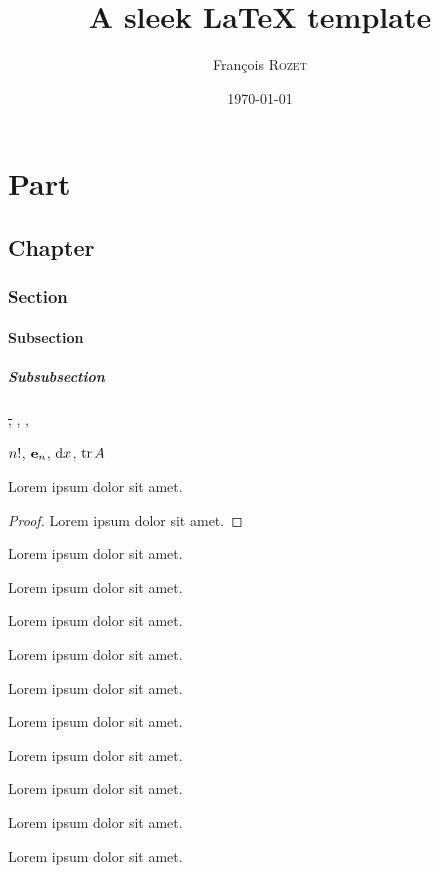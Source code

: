 \documentclass[a4paper, 12pt]{report}
\title{A sleek \LaTeX{} template}
\author{François \textsc{Rozet}\\}
\date{\today}
\begin{document}
	
	\mytableofcontents
	\part{Part}
	\chapter{Chapter}
	\section{Section}
	\subsection{Subsection}
	\subsubsection{Subsubsection}
	\newpage	
	
	\st, \tq, \cad, \Cad
	
	\vspace{2cm}
	
	$n!$, $\mathbf{e}_{n}$, $\mathrm{d} x$, $\operatorname{tr}{A}$
	
	\vspace{2cm}
	
	\begin{thm}
		Lorem ipsum dolor sit amet.
	\end{thm}
	\begin{proof}
		Lorem ipsum dolor sit amet.
	\end{proof}
	\begin{lem}
		Lorem ipsum dolor sit amet.
	\end{lem}
	\begin{prop}
		Lorem ipsum dolor sit amet.
	\end{prop}
	\begin{defn}
		Lorem ipsum dolor sit amet.
	\end{defn}
	\begin{hyp}
		Lorem ipsum dolor sit amet.
	\end{hyp}
	\begin{quest}
		Lorem ipsum dolor sit amet.
	\end{quest}
	\begin{answ}
		Lorem ipsum dolor sit amet.
	\end{answ}
	\begin{expl}
		Lorem ipsum dolor sit amet.
	\end{expl}
	\begin{rmk}
		Lorem ipsum dolor sit amet.
	\end{rmk}
	\begin{note}
		Lorem ipsum dolor sit amet.
	\end{note}
	\begin{tip}
		Lorem ipsum dolor sit amet.
	\end{tip}
\end{document}
